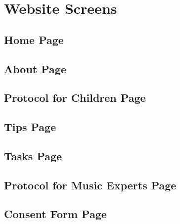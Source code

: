 \chapter{Website Screens}

\section{Home Page}



\section{About Page}



\section{Protocol for Children Page}



\section{Tips Page}



\section{Tasks Page}



\section{Protocol for Music Experts Page}



\section{Consent Form Page}

